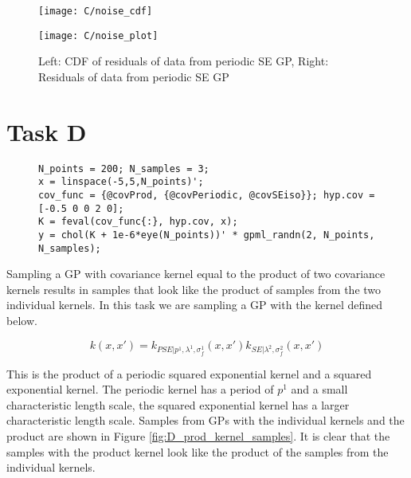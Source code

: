 \documentclass[11pt]{article}
\begin{document}
\begin{figure}[h]
    \centering
    \begin{minipage}{0.5\textwidth}
        \centering
        \texttt{[image: C/noise\_cdf]} %
    \end{minipage}%
    \begin{minipage}{0.5\textwidth}
        \centering
        \texttt{[image: C/noise\_plot]} %
    \end{minipage}
    \caption{Left: CDF of residuals of data from periodic SE GP, Right: Residuals of data from periodic SE GP}
    \label{fig:C_noise_distribution}
\end{figure}

\section{Task D}

\begin{figure}[h]
\begin{lstlisting}[caption=Code to sample a GP with covariance defined by the product of a periodic SE kernel and a SE kernel, captionpos=b, basicstyle=\small, frame=tlrb]
N_points = 200; N_samples = 3;
x = linspace(-5,5,N_points)';
cov_func = {@covProd, {@covPeriodic, @covSEiso}}; hyp.cov = [-0.5 0 0 2 0];
K = feval(cov_func{:}, hyp.cov, x);
y = chol(K + 1e-6*eye(N_points))' * gpml_randn(2, N_points, N_samples);
\end{lstlisting}
\label{lst:2D}
\end{figure}

Sampling a GP with covariance kernel equal to the product of two covariance kernels results in samples that look like the product of samples from the two individual kernels. In this task we are sampling a GP with the kernel defined below.

\[k(x, x') = k_{PSE | p^1, \lambda^1, \sigma_f^1}(x, x')k_{SE | \lambda^2, \sigma_f^2}(x, x')\]

This is the product of a periodic squared exponential kernel and a squared exponential kernel. The periodic kernel has a period of $p^1$ and a small characteristic length scale, the squared exponential kernel has a larger characteristic length scale. Samples from GPs with the individual kernels and the product are shown in Figure \ref{fig:D_prod_kernel_samples}. It is clear that the samples with the product kernel look like the product of the samples from the individual kernels.
\end{document}
